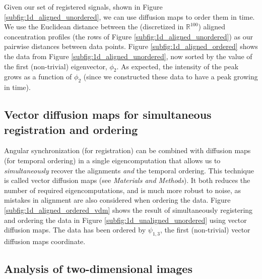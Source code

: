 \documentclass{pnastwo}
\begin{document}
\begin{article}
Given our set of registered signals, shown in Figure \ref{subfig:1d_aligned_unordered}, we can use diffusion maps to order them in time.
%
We use the Euclidean distance between the (discretized in $\mathbb{R}^{100}$) aligned concentration profiles (the rows of Figure \ref{subfig:1d_aligned_unordered}) as our pairwise distances between data points.
%
Figure \ref{subfig:1d_aligned_ordered} shows the data from Figure \ref{subfig:1d_aligned_unordered}, now sorted by the value of the first (non-trivial) eigenvector, $\phi_2$.
%
As expected, the intensity of the peak grows as a function of $\phi_2$ (since we constructed these data
to have a peak growing in time).
%
%

\subsection{Vector diffusion maps for simultaneous registration and ordering}

%
%
Angular synchronization (for registration) can be combined with diffusion maps (for temporal ordering) in a single eigencomputation that allows us to {\em simultaneously} recover the alignments {\em and} the temporal ordering.
%
This technique is called vector diffusion maps \cite{singer2012vector} (see {\it Materials and Methods}).
%
It both reduces the number of required eigencomputations, and is much more robust to noise, as mistakes in alignment are also considered when ordering the data.
%
Figure \ref{subfig:1d_aligned_ordered_vdm} shows the result of simultaneously registering and ordering the data in Figure \ref{subfig:1d_unaligned_unordered} using vector diffusion maps.
%
The data has been ordered by $\psi_{1, 3}$, the first (non-trivial) vector diffusion maps coordinate.

\subsection{Analysis of two-dimensional images}


\end{article}
\end{document}
